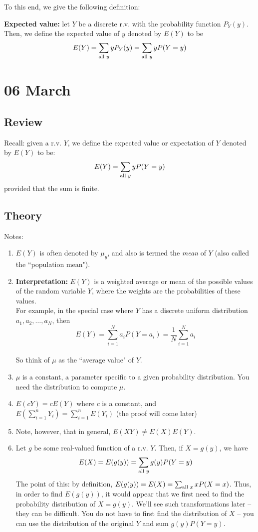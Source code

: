 \documentclass[12pt]{article}
\begin{document}
To this end, we give the following definition:

\textbf{Expected value:} let $Y$ be a discrete r.v. with the probability function $P_Y (y)$. Then, we define the expected value of $y$ denoted by $E(Y)$ to be
\[
    E(Y) = \sum_{\textnormal{all } y} y P_Y (y) = \sum_{\textnormal{all } y} y P(Y = y)
\]

\section{06 March}
\subsection{Review}
Recall: given a r.v. $Y$, we define the expected value or expectation of $Y$ denoted by $E(Y)$ to be:
\[
    E(Y) = \sum_{\textnormal{all } y} y P(Y = y)
\]
provided that the sum is finite.

\subsection{Theory}
Notes:
\begin{enumerate}
    \item $E(Y)$ is often denoted by $\mu_y$, and also is termed the \emph{mean} of $Y$ (also called the ``population mean").
    \item \textbf{Interpretation:} $E(Y)$ is a weighted average or mean of the possible values of the random variable $Y$, where the weights are the probabilities of these values. \\
        For example, in the special case where $Y$ has a discrete uniform distribution $a_1, a_2, \ldots, a_N$, then \\
            \[
                E(Y) = \sum_{i = 1}^{N} a_i P(Y = a_i) = \frac{1}{N} \sum_{i = 1}^{N} a_i
            \]
         \\ So think of $\mu$ as the ``average value" of $Y$.
    \item $\mu$ is a constant, a parameter specific to a given probability distribution. You need the distribution to compute $\mu$.
    \item $E(c Y) = c E(Y)$ where $c$ is a constant, and $E (\sum_{i=1}^{n} Y_i) = \sum_{i=1}^{n} E(Y_i)$ (the proof will come later)
    \item Note, however, that in general, $E(XY) \neq E(X)E(Y)$.
    \item Let $g$ be some real-valued function of a r.v. $Y$. Then, if $X = g(y)$, we have
        \[
            E(X) = E(g(y)) = \sum_{\textnormal{all } y} g(y) P(Y=y)
        \]
        The point of this: by definition, $E(g(y)) = E(X) = \sum_{\textnormal{all } x} x P(X = x)$. Thus, in order to find $E(g(y))$, it would appear that we first need to find the probability distribution of $X = g(y)$. We'll see such transformations later -- they can be difficult. You do not have to first find the distribution of $X$ -- you can use the distribution of the original $Y$ and sum $g(y)P(Y=y)$.
\end{enumerate}
\end{document}
